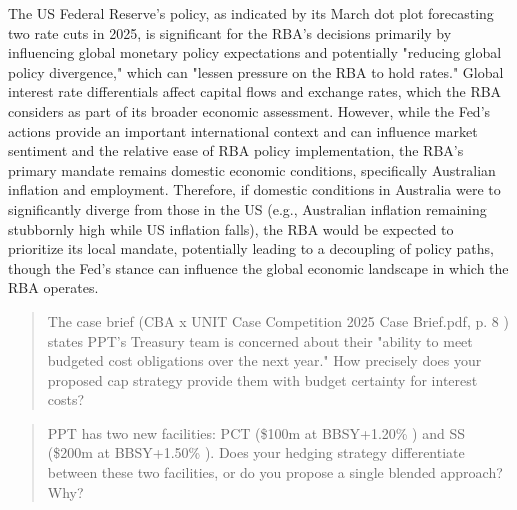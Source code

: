 \documentclass[11pt, a4paper, british]{article}
\begin{document}
The US Federal Reserve's policy, as indicated by its March dot plot forecasting two rate cuts in 2025, is significant for the RBA's decisions primarily by influencing global monetary policy expectations and potentially "reducing global policy divergence," which can "lessen pressure on the RBA to hold rates." Global interest rate differentials affect capital flows and exchange rates, which the RBA considers as part of its broader economic assessment. However, while the Fed's actions provide an important international context and can influence market sentiment and the relative ease of RBA policy implementation, the RBA's primary mandate remains domestic economic conditions, specifically Australian inflation and employment. Therefore, if domestic conditions in Australia were to significantly diverge from those in the US (e.g., Australian inflation remaining stubbornly high while US inflation falls), the RBA would be expected to prioritize its local mandate, potentially leading to a decoupling of policy paths, though the Fed's stance can influence the global economic landscape in which the RBA operates.  

\newpage

\begin{quote}
    The case brief (CBA x UNIT Case Competition 2025 Case Brief.pdf, p. 8 ) states PPT's Treasury team is concerned about their "ability to meet budgeted cost obligations over the next year." How precisely does your proposed cap strategy provide them with budget certainty for interest costs?
\end{quote}

\newpage

\begin{quote}
    PPT has two new facilities: PCT (\$100m at BBSY+1.20\% ) and SS (\$200m at BBSY+1.50\% ). Does your hedging strategy differentiate between these two facilities, or do you propose a single blended approach? Why?
\end{quote}
\end{document}
